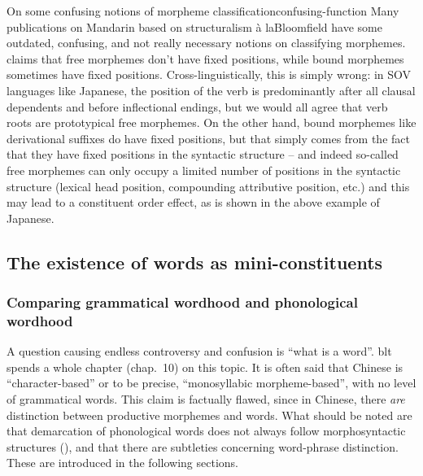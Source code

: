 \documentclass[UTF8, a4paper, oneside, scheme=plain]{ctexrep}
\newcommand*{\citechap}[1]{chap.~{#1}}
\newcommand*{\citepage}[1]{p.~{#1}}
\newcommand*{\term}[1]{\emph{#1}}
\newcommand{\ala}{à la}
\begin{document}
\begin{infobox}{On some confusing notions of morpheme classification}{confusing-function}
    Many publications on Mandarin based on structuralism \ala Bloomfield 
    have some outdated, confusing, and not really necessary 
    notions on classifying morphemes.
    \citet[\citepage{16}]{zhudexigrammar} claims that 
    free morphemes don't have fixed positions, 
    while bound morphemes sometimes have fixed positions.
    Cross-linguistically, this is simply wrong: 
    in SOV languages like Japanese, 
    the position of the verb is predominantly 
    after all clausal dependents and before inflectional endings, 
    but we would all agree that verb roots are prototypical free morphemes.
    On the other hand, 
    bound morphemes like derivational suffixes 
    do have fixed positions, 
    but that simply comes from the fact that 
    they have fixed positions in the syntactic structure -- 
    and indeed so-called free morphemes can only occupy a limited number 
    of positions in the syntactic structure 
    (lexical head position, compounding attributive position, etc.)
    and this may lead to a constituent order effect, 
    as is shown in the above example of Japanese.
\end{infobox}

\subsection{The existence of words as mini-constituents}\label{sec:pos.word}

\subsubsection{Comparing grammatical wordhood and phonological wordhood}\label{sec:pos.word.phonological}

A question causing endless controversy and confusion 
is ``what is a word''. 
\ac{blt} spends a whole chapter (\citechap{10}) on this topic.
It is often said that Chinese is ``character-based''
or to be precise, ``monosyllabic morpheme-based'',
with no level of grammatical words.
This claim is factually flawed, 
since in Chinese, there \term{are} distinction between 
productive morphemes and words.
What should be noted are
that demarcation of phonological words does not always follow morphosyntactic structures
(),
and that there are subtleties concerning word-phrase distinction. 
These are introduced in the following sections.
\end{document}
